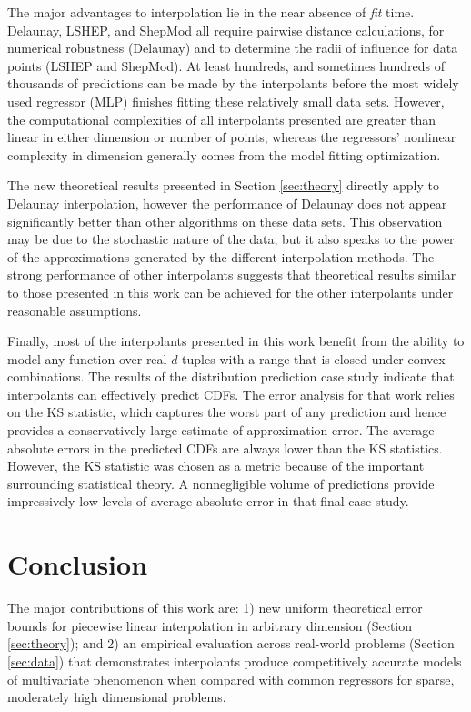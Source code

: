 \documentclass[smallextended,final]{svjour3}  %
\begin{document}
The major advantages to interpolation lie in the near absence of
\textit{fit} time. Delaunay, LSHEP, and ShepMod all require pairwise
distance calculations, for numerical robustness (Delaunay) and to
determine the radii of influence for data points (LSHEP and
ShepMod). At least hundreds, and sometimes hundreds of thousands of
predictions can be made by the interpolants before the most widely
used regressor (MLP) finishes fitting these relatively small data
sets.  However, the computational complexities of all interpolants
presented are greater than linear in either dimension or number of
points, whereas the regressors' nonlinear complexity in dimension
generally comes from the model fitting optimization.

The new theoretical results presented in Section \ref{sec:theory}
directly apply to Delaunay interpolation, however the performance of
Delaunay does not appear significantly better than other algorithms on
these data sets.  This observation may be due to the stochastic nature
of the data, but it also speaks to the power of the approximations
generated by the different interpolation methods.  The strong
performance of other interpolants suggests that theoretical results
similar to those presented in this work can be achieved for the other
interpolants under reasonable assumptions.

Finally, most of the interpolants presented in this work benefit from
the ability to model any function over real $d$-tuples with a range
that is closed under convex combinations. The results of the
distribution prediction case study indicate that interpolants can
effectively predict CDFs. The error analysis for that work relies on
the KS statistic, which captures the worst part of any prediction and
hence provides a conservatively large estimate of approximation
error. The average absolute errors in the predicted CDFs are always
lower than the KS statistics. However, the KS statistic was chosen as
a metric because of the important surrounding statistical theory. A
nonnegligible volume of predictions provide impressively low levels of
average absolute error in that final case study.



\section{Conclusion}
\label{sec:conclusion}

The major contributions of this work are: 1) new uniform theoretical
error bounds for piecewise linear interpolation in arbitrary dimension
(Section \ref{sec:theory}); and 2) an empirical evaluation across
real-world problems (Section \ref{sec:data}) that demonstrates
interpolants produce competitively accurate models of multivariate
phenomenon when compared with common regressors for sparse, moderately
high dimensional problems.
\end{document}
